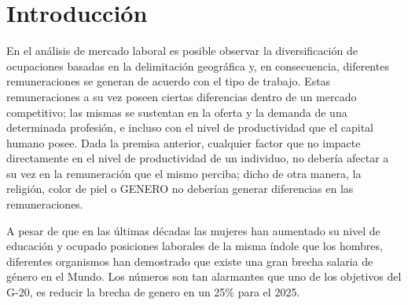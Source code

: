



\newpage
\section{Introducci\'on}
\label{chapter1}

En el an\'alisis de mercado laboral es posible observar la diversificaci\'on de ocupaciones basadas en la delimitaci\'on geogr\'afica y, en consecuencia, diferentes remuneraciones se generan de acuerdo con el tipo de trabajo. Estas remuneraciones a su vez poseen ciertas diferencias dentro de un mercado competitivo; las mismas se sustentan en la oferta y la demanda de una determinada profesi\'on, e incluso con el nivel de productividad que el capital humano posee. Dada la premisa anterior, cualquier factor que no impacte directamente en el nivel de productividad de un individuo, no deber\'ia afectar a su vez en la remuneraci\'on que el mismo perciba; dicho de otra manera, la religi\'on, color de piel o GENERO no deber\'ian generar diferencias en las remuneraciones. \cite{RodriguezPerez_2014}


A pesar de que en las \'ultimas d\'ecadas las mujeres han aumentado su nivel de educaci\'on y ocupado posiciones laborales de la misma \'indole que los hombres, diferentes organismos han demostrado que existe una gran brecha salaria de g\'enero en el Mundo. Los n\'umeros son tan alarmantes que uno de los objetivos del G-20, es reducir la brecha de genero en un 25\% para el 2025. \cite{G20_2019}

